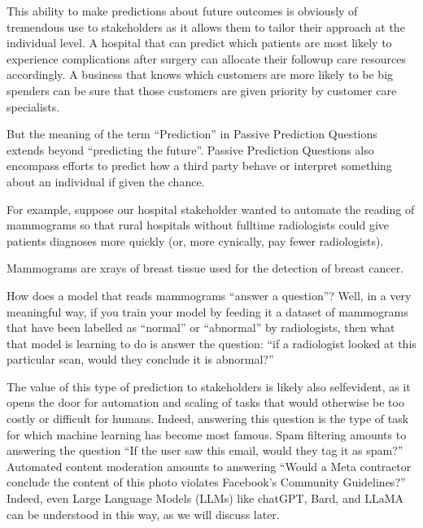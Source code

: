 \documentclass[letterpaper,10pt,english]{jupyterBook}
\begin{document}
\sphinxAtStartPar
This ability to make predictions about future outcomes is obviously of tremendous use to stakeholders as it allows them to tailor their approach at the individual level. A hospital that can predict which patients are most likely to experience complications after surgery can allocate their follow\sphinxhyphen{}up care resources accordingly. A business that knows which customers are more likely to be big spenders can be sure that those customers are given priority by customer care specialists.

\sphinxAtStartPar
But the meaning of the term “Prediction” in Passive Prediction Questions extends beyond “predicting the future”. Passive Prediction Questions also encompass efforts to predict how a third party  behave or interpret something about an individual if given the chance.

\sphinxAtStartPar
For example, suppose our hospital stakeholder wanted to automate the reading of mammograms so that rural hospitals without full\sphinxhyphen{}time radiologists could give patients diagnoses more quickly (or, more cynically, pay fewer radiologists).%
\begin{footnote}[2]\sphinxAtStartFootnote
Mammograms are x\sphinxhyphen{}rays of breast tissue used for the detection of breast cancer.
%
\end{footnote} How does a model that reads mammograms “answer a question”? Well, in a very meaningful way, if you train your model by feeding it a dataset of mammograms that have been labelled as “normal” or “abnormal” by radiologists, then what that model is learning to do is answer the question: “if a radiologist looked at this particular scan, would they conclude it is abnormal?”

\sphinxAtStartPar
The value of this type of prediction to stakeholders is likely also self\sphinxhyphen{}evident, as it opens the door for automation and scaling of tasks that would otherwise be too costly or difficult for humans. Indeed, answering this question is the type of task for which machine learning has become most famous. Spam filtering amounts to answering the question “If the user saw this email, would they tag it as spam?” Automated content moderation amounts to answering “Would a Meta contractor conclude the content of this photo violates Facebook’s Community Guidelines?” Indeed, even Large Language Models (LLMs) like chatGPT, Bard, and LLaMA can be understood in this way, as we will discuss later.
\end{document}
